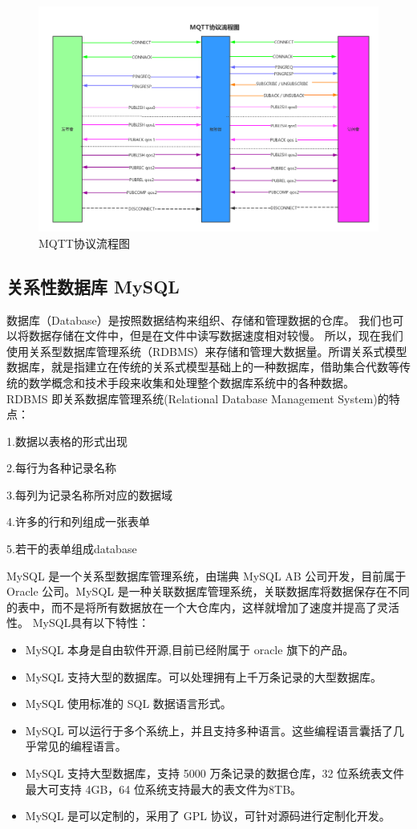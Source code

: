 \begin{figure}[htbp]
	\centering
	\includegraphics[width=1\linewidth]{figure/3-1}
	\caption{MQTT协议流程图}
	\label{fig:3-1}
\end{figure}


\subsection{关系性数据库 MySQL}


数据库（Database）是按照数据结构来组织、存储和管理数据的仓库。
我们也可以将数据存储在文件中，但是在文件中读写数据速度相对较慢。
所以，现在我们使用关系型数据库管理系统（RDBMS）来存储和管理大数据量。所谓关系式模型数据库，就是指建立在传统的关系式模型基础上的一种数据库，借助集合代数等传统的数学概念和技术手段来收集和处理整个数据库系统中的各种数据。
\\RDBMS 即关系数据库管理系统(Relational Database Management System)的特点：

1.数据以表格的形式出现

2.每行为各种记录名称

3.每列为记录名称所对应的数据域

4.许多的行和列组成一张表单

5.若干的表单组成database


MySQL 是一个关系型数据库管理系统，由瑞典 MySQL AB 公司开发，目前属于 Oracle 公司。MySQL 是一种关联数据库管理系统，关联数据库将数据保存在不同的表中，而不是将所有数据放在一个大仓库内，这样就增加了速度并提高了灵活性。
MySQL具有以下特性：
\begin{itemize}
	\item  MySQL 本身是自由软件开源,目前已经附属于 oracle 旗下的产品。
	\item MySQL 支持大型的数据库。可以处理拥有上千万条记录的大型数据库。
	\item MySQL 使用标准的 SQL 数据语言形式。
	\item MySQL 可以运行于多个系统上，并且支持多种语言。这些编程语言囊括了几乎常见的编程语言。
	\item MySQL 支持大型数据库，支持 5000 万条记录的数据仓库，32 位系统表文件最大可支持 4GB，64 位系统支持最大的表文件为8TB。
	\item MySQL 是可以定制的，采用了 GPL 协议，可针对源码进行定制化开发。
\end{itemize}

